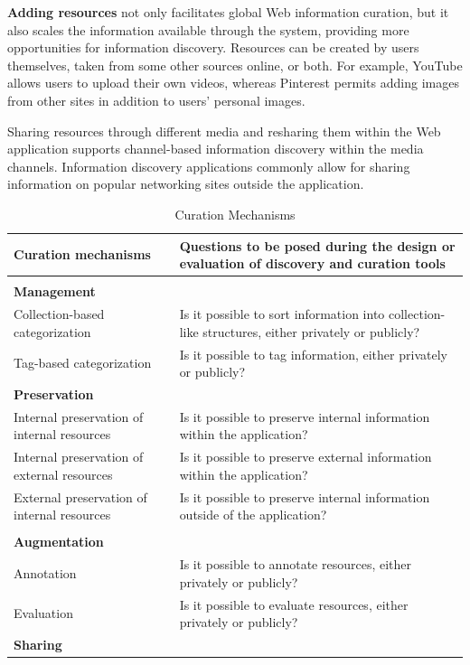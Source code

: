 \documentclass{sigchi}
\begin{document}
{{{\textbf{Adding resources} not only facilitates global Web information curation, but it also scales the information available through the system, providing more opportunities for information discovery. Resources can be created by users themselves, taken from some other sources online, or both. For example, YouTube allows users to upload their own videos, whereas Pinterest permits adding images from other sites in addition to users' personal images. 

Sharing resources through different media and resharing them within the Web application supports channel-based information discovery within the media channels. Information discovery applications commonly allow for sharing information on popular networking sites outside the application.
} %

\begin{table}[ht!]
\caption{Curation Mechanisms}
\label{table:curation}
\begin{tabular}{|p{}|  p{}|}
\hline
Curation mechanisms  & Questions to be posed during the design or evaluation of  discovery and curation tools  \\
\hline
& \\
\textbf{Management} & \\
Collection-based categorization     & Is it possible to sort information into collection-like structures, either privately or publicly? \\
Tag-based categorization          	& Is it possible to tag information, either privately or publicly? \\
\textbf{Preservation} & \\
Internal preservation of internal resources		& Is it possible to preserve internal information within the application? \\
Internal preservation of external resources     & Is it possible to preserve external information within the application? \\
External preservation of internal resources     & Is it possible to preserve internal information outside of the application? \\ 
& \\
\textbf{Augmentation} & \\
Annotation & Is it possible to annotate resources, either privately or publicly? \\ 
Evaluation & Is it possible to evaluate resources, either privately or publicly? \\       
\textbf{Sharing} & \\

\end{tabular}
\end{table}}}
\end{document}
